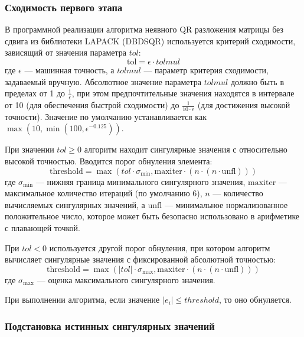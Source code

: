 \subsubsection{Сходимость первого этапа}

В программной реализации алгоритма неявного QR разложения матрицы без сдвига из библиотеки LAPACK (DBDSQR) \cite{LAPACK_DBDSQR} используется критерий сходимости, зависящий от значения параметра \(tol\):
\begin{equation}
\text{tol} = \epsilon \cdot tolmul
\end{equation}
где \(\epsilon\) — машинная точность, а \(tolmul\) — параметр критерия сходимости, задаваемый вручную. Абсолютное значение параметра \(tolmul\) должно быть в пределах от 1 до \(\frac{1}{\epsilon}\), при этом предпочтительные значения находятся в интервале от 10 (для обеспечения быстрой сходимости) до \(\frac{1}{10 \cdot \epsilon}\) (для достижения высокой точности). Значение по умолчанию устанавливается как \(\max(10, \min(100, \epsilon^{-0.125}))\).

При значении \(tol \geq 0\) алгоритм находит сингулярные значения с относительно высокой точностью. Вводится порог обнуления элемента:
\begin{equation}
\text{threshold} = \max(tol \cdot \sigma_{\text{min}}, \text{maxiter} \cdot (n \cdot (n \cdot \text{unfl})))
\end{equation}
где \(\sigma_{\text{min}}\) — нижняя граница минимального сингулярного значения, \(\text{maxiter}\) — максимальное количество итераций (по умолчанию 6), \(n\) — количество вычисляемых сингулярных значений, а \(\text{unfl}\) — минимальное нормализованное положительное число, которое может быть безопасно использовано в арифметике с плавающей точкой.

При \(tol < 0\) используется другой порог обнуления, при котором алгоритм вычисляет сингулярные значения с фиксированной абсолютной точностью:
\begin{equation}
\text{threshold} = \max (|tol| \cdot \sigma_{\text{max}}, \text{maxiter} \cdot (n \cdot (n \cdot \text{unfl})))
\end{equation}
где \(\sigma_{\text{max}}\) — оценка максимального сингулярного значения.

При выполнении алгоритма, если значение \(|e_i| \le threshold\), то оно обнуляется.

\subsubsection{Подстановка истинных сингулярных значений}

